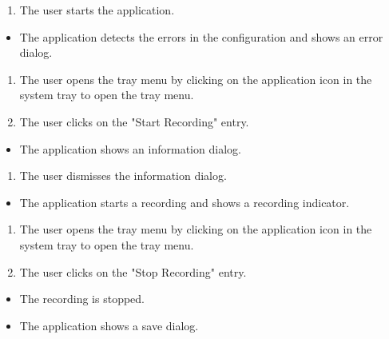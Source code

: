 \begin{tests}
    {\begin{enumerate}
        \item The \gls{user} starts the application.
    \end{enumerate}}
    {\begin{itemize}
        \item The application detects the errors in the configuration and shows an error dialog.
    \end{itemize}}

    {\begin{enumerate}
        \item The \gls{user} opens the tray menu by clicking on the application icon in the system tray to open the tray menu.
        \item The \gls{user} clicks on the "Start Recording" entry.
    \end{enumerate}}
    {\begin{itemize}
        \item The application shows an information dialog.
    \end{itemize}}
    
    {\begin{enumerate}
        \item The \gls{user} dismisses the information dialog.
    \end{enumerate}}
    {\begin{itemize}
        \item The application starts a recording and shows a recording indicator.
    \end{itemize}}
    
    {\begin{enumerate}
        \item The \gls{user} opens the tray menu by clicking on the application icon in the system tray to open the tray menu.
        \item The \gls{user} clicks on the "Stop Recording" entry.
    \end{enumerate}}
    {\begin{itemize}
        \item The recording is stopped.
        \item The application shows a save dialog.
    \end{itemize}}


\end{tests}

